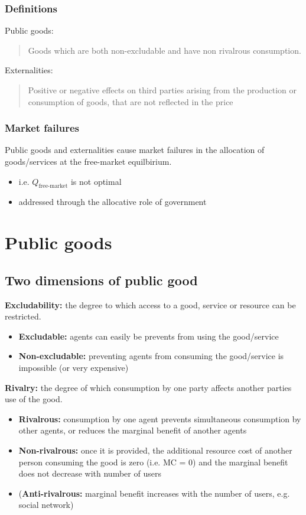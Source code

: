 \documentclass[class=report, crop=false, 12pt,a4paper]{standalone}
\begin{document}
\subsubsection{Definitions}
Public goods:
\begin{quote}
	Goods which are both non-excludable and have non rivalrous consumption.
\end{quote}
Externalities:
\begin{quote}
	Positive or negative effects on third parties arising from the production or consumption of goods, that are not reflected in the price
\end{quote}
\subsubsection{Market failures}
Public goods and externalities cause market failures in the allocation of goods/services at the free-market equilbirium.
\begin{itemize}
	\item i.e. $Q_{\textrm{free-market}}$ is not optimal
	\item addressed through the allocative role of government
\end{itemize}
\section{Public goods}
\subsection{Two dimensions of public good}
\textbf{Excludability:} the degree to which access to a good, service or resource can be restricted.
\begin{itemize}
	\item \textbf{Excludable:} agents can easily be prevents from using the good/service
	\item \textbf{Non-excludable:} preventing agents from consuming the good/service is impossible (or very expensive)
\end{itemize}
\textbf{Rivalry:} the degree of which consumption by one party affects another parties use of the good.
\begin{itemize}
	\item \textbf{Rivalrous:} consumption by one agent prevents simultaneous consumption by other agents, or reduces the marginal benefit of another agents
	\item \textbf{Non-rivalrous:} once it is provided, the additional resource cost of another person consuming the good is zero (i.e. MC = 0) and the marginal benefit does not decrease with number of users
	\item (\textbf{Anti-rivalrous:} marginal benefit increases with the number of users, e.g. social network)
\end{itemize}
\end{document}
